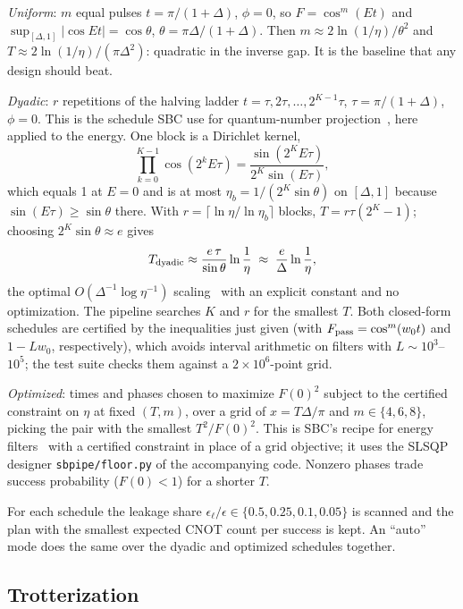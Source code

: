 \documentclass[aps,pra,twocolumn,superscriptaddress,nofootinbib]{revtex4-2}
\begin{document}
\emph{Uniform}: $m$ equal pulses $t=\pi/(1+\Delta)$, $\phi=0$, so $F=\cos^m(Et)$ and
$\sup_{[\Delta,1]}|\cos Et|=\cos\theta$, $\theta=\pi\Delta/(1+\Delta)$. Then
$m\approx2\ln(1/\eta)/\theta^2$ and $T\approx2\ln(1/\eta)/(\pi\Delta^2)$: quadratic in the inverse gap.
It is the baseline that any design should beat.

\emph{Dyadic}: $r$ repetitions of the halving ladder $t=\tau,2\tau,\dots,2^{K-1}\tau$,
$\tau=\pi/(1+\Delta)$, $\phi=0$. This is the schedule SBC use for quantum-number
projection~\cite{Stetcu2023}, here applied to the energy. One block is a Dirichlet kernel,
\begin{equation}
\prod_{k=0}^{K-1}\cos(2^kE\tau)=\frac{\sin(2^KE\tau)}{2^K\sin(E\tau)},
\label{eq:dirichlet}
\end{equation}
which equals 1 at $E=0$ and is at most $\eta_b=1/(2^K\sin\theta)$ on $[\Delta,1]$ because
$\sin(E\tau)\ge\sin\theta$ there. With $r=\lceil\ln\eta/\ln\eta_b\rceil$ blocks,
$T=r\tau(2^K-1)$; choosing $2^K\sin\theta\approx e$ gives
\begin{equation}
T_{\rm dyadic}\approx\frac{e\,\tau}{\sin\theta}\ln\frac1\eta\;\approx\;\frac{e}{\Delta}\ln\frac1\eta ,
\end{equation}
the optimal $O(\Delta^{-1}\log\eta^{-1})$ scaling~\cite{Lin2020} with an explicit constant and no
optimization. The pipeline searches $K$ and $r$ for the smallest $T$. Both closed-form schedules are
certified by the inequalities just given (with $F_{\rm pass}=\cos^m(w_0t)$ and $1-Lw_0$,
respectively), which avoids interval arithmetic on filters with $L\sim10^{3}$--$10^{5}$; the
test suite checks them against a $2\times10^6$-point grid.

\emph{Optimized}: times and phases chosen to maximize $F(0)^2$ subject to the certified constraint on
$\eta$ at fixed $(T,m)$, over a grid of $x=T\Delta/\pi$ and $m\in\{4,6,8\}$, picking the pair with the
smallest $T^2/F(0)^2$. This is SBC's recipe for energy filters~\cite{Stetcu2023} with a certified
constraint in place of a grid objective; it uses the SLSQP designer \texttt{sbpipe/floor.py} of the accompanying code.
Nonzero phases trade success probability ($F(0)<1$) for a shorter $T$.

For each schedule the leakage share $\epsilon_\ell/\epsilon\in\{0.5,0.25,0.1,0.05\}$ is scanned and the
plan with the smallest expected CNOT count per success is kept. An ``auto'' mode does the same over the dyadic and optimized
schedules together.

\subsection{Trotterization}
\end{document}

